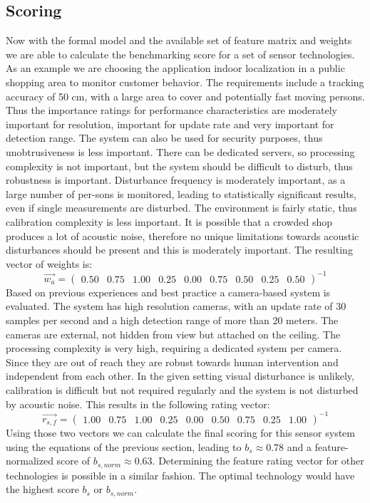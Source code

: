 \subsection{Scoring}
Now with the formal model and the available set of feature matrix and weights we are able to calculate the benchmarking score for a set of sensor technologies. As an example we are choosing the application indoor localization in a public shopping area to monitor customer behavior. The requirements include a tracking accuracy of 50 cm, with a large area to cover and potentially fast moving persons. Thus the importance ratings for performance characteristics are moderately important for resolution, important for update rate and very important for detection range. The system can also be used for security purposes, thus unobtrusiveness is less important. There can be dedicated servers, so processing complexity is not important, but the system should be difficult to disturb, thus robustness is important. Disturbance frequency is moderately important, as a large number of per-sons is monitored, leading to statistically significant results, even if single measurements are disturbed. The environment is fairly static, thus calibration complexity is less important. It is possible that a crowded shop produces a lot of acoustic noise, therefore no unique limitations towards acoustic disturbances should be present and this is moderately important. The resulting vector of weights is:
\begin{equation}
\overrightarrow{w_a}=
\begin{pmatrix}
0.50 & 0.75 & 1.00 & 0.25 & 0.00 & 0.75 & 0.50 & 0.25 & 0.50
\end{pmatrix}^{-1}
\end{equation}
Based on previous experiences and best practice a camera-based system is evaluated. The system has high resolution cameras, with an update rate of 30 samples per second and a high detection range of more than 20 meters. The cameras are external, not hidden from view but attached on the ceiling. The processing complexity is very high, requiring a dedicated system per camera. Since they are out of reach they are robust towards human intervention and independent from each other. In the given setting visual disturbance is unlikely, calibration is difficult but not required regularly and the system is not disturbed by acoustic noise. This results in the following rating vector:
\begin{equation}
\overrightarrow{r_{s,f}}=
\begin{pmatrix}
1.00 & 0.75 & 1.00 & 0.25 & 0.00 & 0.50 & 0.75 & 0.25 & 1.00
\end{pmatrix}^{-1}
\end{equation}
Using those two vectors we can calculate the final scoring for this sensor system using the equations of the previous section, leading to $b_s \approx 0.78$ and a feature-normalized score of $b_{s,norm} \approx 0.63$. Determining the feature rating vector for other technologies is possible in a similar fashion. The optimal technology would have the highest score $b_s$ or $b_{s,norm}$.
\clearpage
